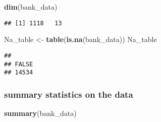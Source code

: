 \documentclass[]{article}
\newenvironment{Shaded}{\begin{snugshade}}{\end{snugshade}}
\newcommand{\KeywordTok}[1]{\textcolor[rgb]{0.13,0.29,0.53}{\textbf{#1}}}
\newcommand{\NormalTok}[1]{#1}
\newcommand{\StringTok}[1]{\textcolor[rgb]{0.31,0.60,0.02}{#1}}
\begin{document}
\begin{Shaded}
\begin{Highlighting}[]
\KeywordTok{dim}\NormalTok{(bank_data)}
\end{Highlighting}
\end{Shaded}

\begin{verbatim}
## [1] 1118   13
\end{verbatim}

\begin{Shaded}
\begin{Highlighting}[]
\NormalTok{Na_table <-}\StringTok{ }\KeywordTok{table}\NormalTok{(}\KeywordTok{is.na}\NormalTok{(bank_data))}
\NormalTok{Na_table}
\end{Highlighting}
\end{Shaded}

\begin{verbatim}
## 
## FALSE 
## 14534
\end{verbatim}

\hypertarget{summary-statistics-on-the-data}{%
\subsubsection{summary statistics on the
data}\label{summary-statistics-on-the-data}}

\begin{Shaded}
\begin{Highlighting}[]
\KeywordTok{summary}\NormalTok{(bank_data)}
\end{Highlighting}
\end{Shaded}
\end{document}
